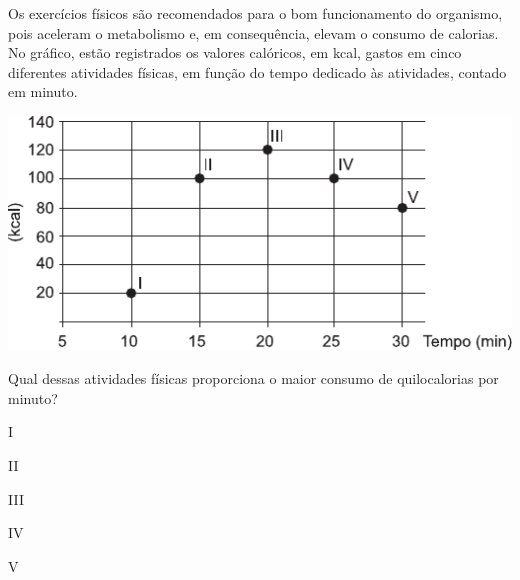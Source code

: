 \questao
Os exercícios físicos são recomendados para o bom funcionamento do organismo, pois aceleram o metabolismo e, em consequência, elevam o consumo de calorias. No gráfico, estão registrados os valores calóricos, em kcal, gastos em cinco diferentes atividades físicas, em função do tempo dedicado às atividades, contado em minuto.
\begin{center}
\includegraphics[width=\columnwidth]{subareas/ciencias_natureza/fisica-4.pdf}
\end{center}
Qual dessas atividades físicas proporciona o maior consumo de quilocalorias por minuto?
\begin{alternativas}
\item I
\item II
\item III
\item IV
\item V
\end{alternativas}

